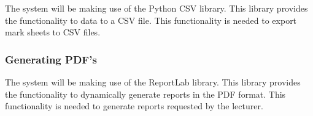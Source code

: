 The system will be making use of the Python CSV library. This library provides the functionality to data to a CSV file. This functionality is needed to export mark sheets to CSV files.

\subsubsection{Generating PDF's}

The system will be making use of the ReportLab library. This library provides the functionality to dynamically generate reports in the PDF format. This functionality is needed to generate reports requested by the lecturer.